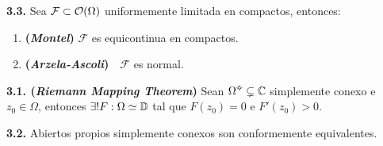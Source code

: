 \begin{theorem}
    \textbf{3.3.} Sea \(\mathcal{F}\subset \mathcal{O}(\Omega)\) uniformemente limitada en compactos, entonces: 
    \vspace{-0.2cm}
    \begin{enumerate}[label = \roman*., left = 0.5cm]
        \item \textbf{(\emph{Montel})}  \(\mathcal{F}\) es equicontinua en compactos. 
        \item \textbf{(\emph{Arzela-Ascoli})}\ \ \(\mathcal{F}\) es normal. 
    \end{enumerate}
\end{theorem}

\begin{theorem}
    \textbf{3.1. (\emph{Riemann Mapping Theorem})} Sean \(\Omega\ab \subsetneq \C\) simplemente conexo e \(z_0 \in \Omega\), entonces \(\exists ! F : \Omega \simeq \mathbb{D}\) tal que \(F(z_0)=0\) e \(F'(z_0)>0\). 
\end{theorem}

\begin{corollary}
    \textbf{3.2.} Abiertos propios simplemente conexos son conformemente equivalentes.
\end{corollary}

